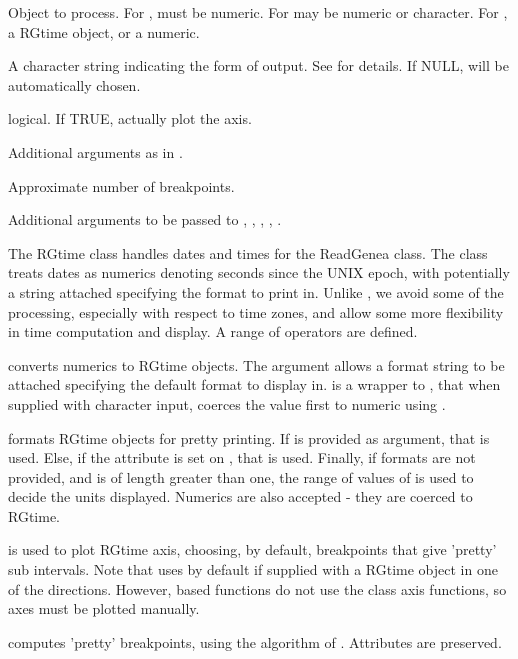 \documentclass[a4paper]{book}
\begin{document}
%
\begin{Arguments}
\begin{ldescription}
\item[\code{x}] Object to process. For , must be numeric. For  may be numeric or character. For , a RGtime object, or a numeric.
\item[\code{format}] A character string indicating the form of output. See  for details. If NULL, will be automatically chosen.
\item[\code{add}] logical. If TRUE, actually plot the axis.
\item[\code{at, side, labels}] Additional arguments as in .
\item[\code{n}] Approximate number of breakpoints.
\item[\code{...}] Additional arguments to be passed to , , , , . 
\end{ldescription}
\end{Arguments}
%
\begin{Details}\relax
The RGtime class handles dates and times for the ReadGenea class. The class treats dates as numerics denoting seconds since the UNIX epoch, with potentially a string attached specifying the format to print in. Unlike , we avoid some of the processing, especially with respect to time zones, and allow some more flexibility in time computation and display. A range of operators are defined.

 converts numerics to RGtime objects. The  argument allows a format string to be attached specifying the default format to display in.  is a wrapper to , that when supplied with character input, coerces the value first to numeric using .

 formats RGtime objects for pretty printing. If  is provided as argument, that is used. Else, if the  attribute is set on , that is used. Finally, if formats are not provided, and  is of length greater than one, the range of values of  is used to decide the units displayed. Numerics are also accepted - they are coerced to RGtime.

 is used to plot RGtime axis, choosing, by default, breakpoints that give 'pretty' sub intervals. Note that  uses  by default if supplied with a RGtime object in one of the directions. However,  based functions do not use the class axis functions, so axes must be plotted manually.

 computes 'pretty' breakpoints, using the algorithm of . Attributes are preserved.

\end{Details}
\end{document}
